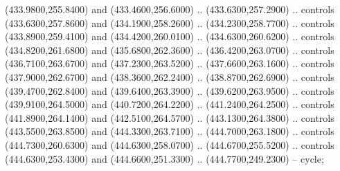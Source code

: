 {\begin{scope}[y=0.80pt, x=0.80pt, yscale=-1, xscale=1, inner sep=0pt, outer sep=0pt, #1]
      (433.9800,255.8400) and (433.4600,256.6000) .. (433.6300,257.2900) .. controls
      (433.6300,257.8600) and (434.1900,258.2600) .. (434.2300,258.7700) .. controls
      (433.8900,259.4100) and (434.4200,260.0100) .. (434.6300,260.6200) .. controls
      (434.8200,261.6800) and (435.6800,262.3600) .. (436.4200,263.0700) .. controls
      (436.7100,263.6700) and (437.2300,263.5200) .. (437.6600,263.1600) .. controls
      (437.9000,262.6700) and (438.3600,262.2400) .. (438.8700,262.6900) .. controls
      (439.4700,262.8400) and (439.6400,263.3900) .. (439.6200,263.9500) .. controls
      (439.9100,264.5000) and (440.7200,264.2200) .. (441.2400,264.2500) .. controls
      (441.8900,264.1400) and (442.5100,264.5700) .. (443.1300,264.3800) .. controls
      (443.5500,263.8500) and (444.3300,263.7100) .. (444.7000,263.1800) .. controls
      (444.7300,260.6300) and (444.6300,258.0700) .. (444.6700,255.5200) .. controls
      (444.6300,253.4300) and (444.6600,251.3300) .. (444.7700,249.2300) -- cycle;


\end{scope}}
